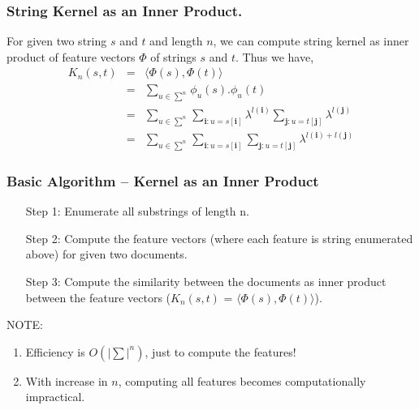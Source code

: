 \documentclass[10pt]{beamer}
\begin{document}
\begin{frame}
	\frametitle{String Kernel as an Inner Product.}
	For given two string $s$ and $t$ and length $n$, we can compute string kernel as inner product of feature vectors
	$\Phi$ of strings $s$ and $t$. Thus we have,
	\centering
	\begin{eqnarray*}
	K_n(s,t) & = & \langle \Phi(s), \Phi(t) \rangle \\
				& = & \sum_{u \in \sum^n} \phi_u(s).\phi_u(t) \\
				& =  &\sum_{u \in \sum^n} \sum_{\textbf{i}:u=s[\textbf{i}]} \lambda^{l(\textbf{i})} 
			\sum_{\textbf{j}:u=t[\textbf{j}]} \lambda^{l(\textbf{j})} \\
			& = & \sum_{u \in \sum^n} \sum_{\textbf{i}:u=s[\textbf{i}]}  \sum_{\textbf{j}:u=t[\textbf{j}]} \lambda^{l(\textbf{i}) + l(\textbf{j})}
	\end{eqnarray*}
\end{frame}

\begin{frame}
	\frametitle{Basic Algorithm -- Kernel as an Inner Product}
	\begin{itemize}
		\item [Step 1:] Enumerate all substrings of length n. 
		\item [Step 2:] Compute the feature vectors (where each feature is string enumerated above) for given two documents.
		\item [Step 3:] Compute the similarity between the documents as inner product between the feature vectors ($K_n(s,t)$ = $\langle\Phi(s),\Phi(t)\rangle$).
	\end{itemize}

	NOTE:
	\begin{enumerate}
		\item Efficiency is ${O(|\sum|^n)}$, just to compute the features!
		\item With increase in $n$, computing all features becomes computationally impractical.
	\end{enumerate}
\end{frame}
\end{document}
